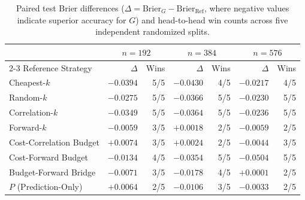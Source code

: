 \begin{table}[htbp]
	\centering\small\renewcommand{\arraystretch}{1.25}\setlength{\tabcolsep}{5pt}
	\caption{Paired test Brier differences ($\Delta = \text{Brier}_G - \text{Brier}_{\text{Ref}}$, where negative values indicate superior accuracy for $G$) and head-to-head win counts across five independent randomized splits.}
	\label{tab:baselines-paired}
	\begin{tabular}{l rr rr rr}\hline
		& \multicolumn{2}{c}{$n=192$} & \multicolumn{2}{c}{$n=384$} & \multicolumn{2}{c}{$n=576$}\\
		\cline{2-3}\cline{4-5}\cline{6-7}
		Reference Strategy & $\Delta$ & Wins & $\Delta$ & Wins & $\Delta$ & Wins\\\hline
		Cheapest-$k$ & $-0.0394$ & 5/5 & $-0.0430$ & 4/5 & $-0.0217$ & 4/5\\
		Random-$k$ & $-0.0275$ & 5/5 & $-0.0366$ & 5/5 & $-0.0230$ & 5/5\\
		Correlation-$k$ & $-0.0349$ & 5/5 & $-0.0364$ & 5/5 & $-0.0236$ & 5/5\\
		Forward-$k$ & $-0.0059$ & 3/5 & $+0.0018$ & 2/5 & $-0.0059$ & 2/5\\
		Cost-Correlation Budget & $+0.0074$ & 3/5 & $+0.0024$ & 2/5 & $-0.0044$ & 3/5\\
		Cost-Forward Budget & $-0.0134$ & 4/5 & $-0.0354$ & 5/5 & $-0.0504$ & 5/5\\
		Budget-Forward Bridge & $-0.0071$ & 3/5 & $-0.0178$ & 4/5 & $+0.0001$ & 2/5\\
		$P$ (Prediction-Only) & $+0.0064$ & 2/5 & $-0.0106$ & 3/5 & $-0.0033$ & 2/5\\
		\hline\end{tabular}
\end{table}

